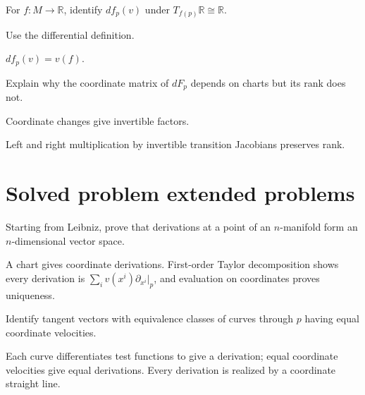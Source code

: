 \begin{exercise}\label{exr:vii04-23}
For \(f:M\to\mathbb R\), identify \(df_p(v)\) under \(T_{f(p)}\mathbb R\cong\mathbb R\).
\end{exercise}
\begin{hint}
Use the differential definition.
\end{hint}
\begin{solution}
\(df_p(v)=v(f)\).
\end{solution}

\begin{exercise}\label{exr:vii04-24}
Explain why the coordinate matrix of \(dF_p\) depends on charts but its rank does not.
\end{exercise}
\begin{hint}
Coordinate changes give invertible factors.
\end{hint}
\begin{solution}
Left and right multiplication by invertible transition Jacobians preserves rank.
\end{solution}


\section{Solved problem extended problems}
\begin{problem}\label{prob:vii04-01}
Starting from Leibniz, prove that derivations at a point of an \(n\)-manifold form an \(n\)-dimensional vector space.
\end{problem}
\begin{solution}
A chart gives coordinate derivations. First-order Taylor decomposition shows every derivation is \(\sum_i v(x^i)\partial_{x^i}|_p\), and evaluation on coordinates proves uniqueness.
\end{solution}

\begin{problem}\label{prob:vii04-02}
Identify tangent vectors with equivalence classes of curves through \(p\) having equal coordinate velocities.
\end{problem}
\begin{solution}
Each curve differentiates test functions to give a derivation; equal coordinate velocities give equal derivations. Every derivation is realized by a coordinate straight line.
\end{solution}

